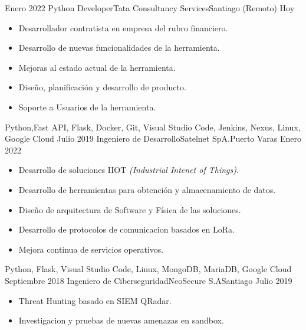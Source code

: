 %
%
%

\begin{experiences}
  \experience
    {Enero 2022}   {Python Developer}{Tata Consultancy Services}{Santiago (Remoto)}
    {Hoy} 
    {
      \begin{itemize}
        \item Desarrollador contratista en empresa del rubro financiero.
        \item Desarrollo de nuevas funcionalidades de la herramienta.
        \item Mejoras al estado actual de la herramienta.
        \item Diseño, planificación y desarrollo de producto.
        \item Soporte a Usuarios de la herramienta.
      \end{itemize}
    }{Python,Fast API, Flask, Docker, Git, Visual Studio Code, Jenkins, Nexus, Linux, Google Cloud}
  \emptySeparator
  \experience
    {Julio 2019} {Ingeniero de Desarrollo}{Satelnet SpA.}{Puerto Varas}
    {Enero 2022}    
    {
      \begin{itemize}
        \item Desarrollo de soluciones IIOT {\it (Industrial Intenet of Things)}.
        \item Desarrollo de herramientas para obtención y almacenamiento de datos.
        \item Diseño de arquitectura de Software y Física de las soluciones.
        \item Desarrollo de protocolos de comunicacion basados en LoRa.
        \item Mejora continua de servicios operativos.                            
      \end{itemize}
    }{Python, Flask, Visual Studio Code, Linux, MongoDB, MariaDB, Google Cloud}
  \emptySeparator
  \experience
    {Septiembre 2018}     {Ingeniero de Ciberseguridad}{NeoSecure S.A}{Santiago}
    {Julio 2019}    
    {
      \begin{itemize}
        \item Threat Hunting basado en SIEM QRadar.
        \item Investigacion y pruebas de nuevas amenazas en sandbox.              

\end{itemize}}
\end{experiences}
